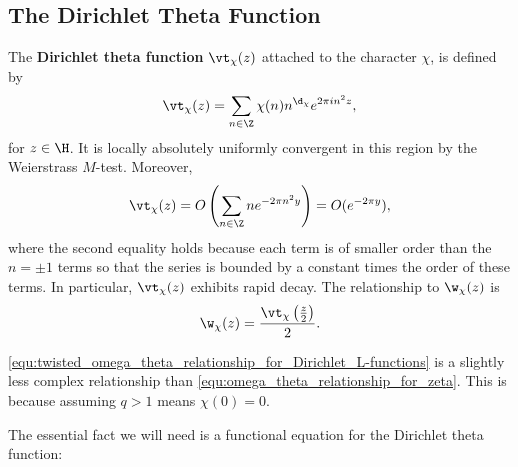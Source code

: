     \subsection*{The Dirichlet Theta Function}
      The \textbf{Dirichlet theta function} $\vt_{\chi}(z)$ attached to the character $\chi$, is defined by
      \[
        \vt_{\chi}(z) = \sum_{n \in \Z}\chi(n)n^{\d_{\chi}}e^{2\pi in^{2}z},
      \]
      for $z \in \H$. It is locally absolutely uniformly convergent in this region by the Weierstrass $M$-test. Moreover,
      \[
        \vt_{\chi}(z) = O\left(\sum_{n \in \Z}ne^{-2\pi n^{2}y}\right) = O(e^{-2\pi y}),
      \]
      where the second equality holds because each term is of smaller order than the $n = \pm 1$ terms so that the series is bounded by a constant times the order of these terms. In particular, $\vt_{\chi}(z)$ exhibits rapid decay. The relationship to $\w_{\chi}(z)$ is
      \begin{equation}\label{equ:twisted_omega_theta_relationship_for_Dirichlet_L-functions}
        \w_{\chi}(z) = \frac{\vt_{\chi}\left(\frac{z}{2}\right)}{2}.
      \end{equation}

      \begin{remark}
        \cref{equ:twisted_omega_theta_relationship_for_Dirichlet_L-functions} is a slightly less complex relationship than \cref{equ:omega_theta_relationship_for_zeta}. This is because assuming $q > 1$ means $\chi(0) = 0$.
      \end{remark}

      The essential fact we will need is a functional equation for the Dirichlet theta function:


